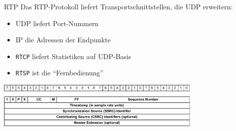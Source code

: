 \begin{defi}{RTP}
    Das RTP-Protokoll liefert Transportschnittstellen, die UDP erweitern:
    \begin{itemize}
        \item UDP liefert Port-Nummern
        \item IP die Adressen der Endpunkte
        \item \texttt{RTCP} liefert Statistiken auf UDP-Basis
        \item \texttt{RTSP} ist die \enquote{Fernbedienung}
    \end{itemize}

    \begin{center}
        \includegraphics[width=0.75\textwidth]{includes/figures/defi_rtp.pdf}
    \end{center}
\end{defi}
